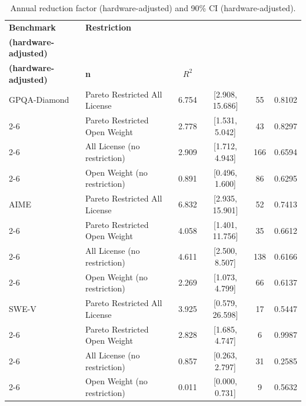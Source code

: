 \renewcommand{\arraystretch}{1.15}

\begin{table}[h!]
\centering
\caption{Annual reduction factor (hardware-adjusted) and 90\% CI (hardware-adjusted).}
\label{tab:regression_results_adjusted}

\small
\begin{tabular}{|l|l|c|c|c|c|}
\hline
\textbf{Benchmark} & \textbf{Restriction} &
\shortstack{\textbf{Annual reduction factor}\\\textbf{(hardware-adjusted)}} &
\shortstack{\textbf{90\% CI}\\\textbf{(hardware-adjusted)}} &
\textbf{n} & \textbf{$R^2$} \\
\hline

GPQA-Diamond & Pareto Restricted All License & 6.754 & [2.908, 15.686] & 55 & 0.8102 \\ \cline{2-6}
\rowcolor{restrgray} \cellcolor{white} & Pareto Restricted Open Weight & 2.778 & [1.531, 5.042] & 43 & 0.8297 \\ \cline{2-6}
\cellcolor{white} & All License (no restriction) & 2.909 & [1.712, 4.943] & 166 & 0.6594 \\ \cline{2-6}
\rowcolor{restrgray} \cellcolor{white} & Open Weight (no restriction) & 0.891 & [0.496, 1.600] & 86 & 0.6295 \\
\hline

AIME & Pareto Restricted All License & 6.832 & [2.935, 15.901] & 52 & 0.7413 \\ \cline{2-6}
\rowcolor{restrgray} \cellcolor{white} & Pareto Restricted Open Weight & 4.058 & [1.401, 11.756] & 35 & 0.6612 \\ \cline{2-6}
\cellcolor{white} & All License (no restriction) & 4.611 & [2.500, 8.507] & 138 & 0.6166 \\ \cline{2-6}
\rowcolor{restrgray} \cellcolor{white} & Open Weight (no restriction) & 2.269 & [1.073, 4.799] & 66 & 0.6137 \\
\hline

SWE\mbox{-}V & Pareto Restricted All License & 3.925 & [0.579, 26.598] & 17 & 0.5447 \\ \cline{2-6}
\rowcolor{restrgray} \cellcolor{white} & Pareto Restricted Open Weight & 2.828 & [1.685, 4.747] & 6 & 0.9987 \\ \cline{2-6}
\cellcolor{white} & All License (no restriction) & 0.857 & [0.263, 2.797] & 31 & 0.2585 \\ \cline{2-6}
\rowcolor{restrgray} \cellcolor{white} & Open Weight (no restriction) & 0.011 & [0.000, 0.731] & 9 & 0.5632 \\
\hline

\end{tabular}
\end{table}
